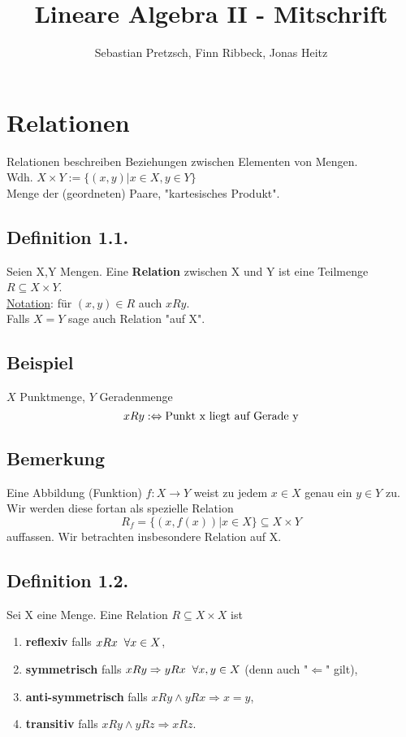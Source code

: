\documentclass[a4paper, 12pt]{extarticle}
\newcommand{\tn}[1]{\textnormal {#1}}
\begin{document}
\title{Lineare Algebra II - Mitschrift}
\author{Sebastian Pretzsch, Finn Ribbeck, Jonas Heitz}
\maketitle
\section{Relationen}
Relationen beschreiben Beziehungen zwischen Elementen von Mengen. \\
Wdh. $X{\times}Y := \{(x,y) | x \in X, y \in Y\}$ \\
Menge der (geordneten) Paare, "kartesisches Produkt".

\subsection*{Definition 1.1.}
Seien X,Y Mengen. Eine \textbf{Relation} zwischen X und Y ist eine Teilmenge $R \subseteq X{\times}Y$. \\
\underline{Notation}: für $(x,y)\in R$ auch $xRy$. \\
Falls $X=Y$ sage auch Relation "auf X".

\subsection*{Beispiel}
$X$ Punktmenge, $Y$ Geradenmenge
$$xRy :\Leftrightarrow \tn{Punkt x liegt auf Gerade y}$$

\subsection*{Bemerkung}
Eine Abbildung (Funktion) $f:X{\to}Y$ weist zu jedem $x\in X$ genau ein $
y\in Y$ zu. \\
Wir werden diese fortan als spezielle Relation
$$R_f = \{(x, f(x)) | x\in X\} \subseteq X{\times}Y$$
auffassen. Wir betrachten insbesondere Relation auf X.

\subsection*{Definition 1.2.}
Sei X eine Menge. Eine Relation $R \subseteq X{\times}X$ ist
\begin{enumerate}[label=(\alph*)]
\item \textbf{reflexiv} falls $xRx \hspace*{2mm}\forall x\in X$,
\item \textbf{symmetrisch} falls $xRy \Rightarrow yRx \hspace*{2mm}\forall x,y\in X$ (denn auch "$\Leftarrow$" gilt),
\item \textbf{anti-symmetrisch} falls $xRy \land yRx \Rightarrow x=y$,
\item \textbf{transitiv} falls $xRy \land yRz \Rightarrow xRz$.
\end{enumerate}
\end{document}
